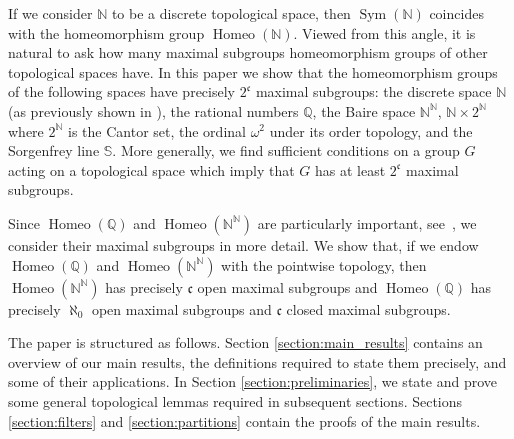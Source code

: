 \documentclass[11pt]{amsart}
\theoremstyle{definition}
\newcommand{\Homeo}{\operatorname{Homeo}}
\newcommand{\N}{\mathbb N}
\newcommand{\Q}{\mathbb Q}
\newcommand{\Sym}{\operatorname{Sym}}
\begin{document}
If we consider $\N$ to be a discrete topological space, then $\Sym(\N)$ coincides with the homeomorphism group $\Homeo(\N)$. Viewed from this angle, it is natural to ask how many maximal subgroups homeomorphism groups of other topological spaces have. 
In this paper we show that the homeomorphism groups of the following spaces have precisely $2^{\mathfrak{c}}$ maximal subgroups: the discrete space $\N$ (as previously shown in \cite{subgroups_macpherson_neumann}), the rational numbers $\Q$, the Baire space $\N^{\N}$, $\N\times 2^{\N}$ where $2^{\N}$ is the Cantor set, the ordinal $\omega^2$ under its order topology, and the Sorgenfrey line $\mathbb{S}$. More generally, we find sufficient conditions on a group $G$ acting on a topological space which imply that $G$ has at least $2^{\mathfrak c}$ maximal subgroups.

Since $\Homeo(\Q)$ and $\Homeo(\N^\N)$ are particularly important, see~\cite{Bruyns, Droste, Mekler, Neumann, Truss}, we consider their maximal subgroups in more detail.  %
We show that, if we endow $\Homeo(\Q)$ and $\Homeo(\N^\N)$ with the pointwise topology, then $\Homeo(\N^\N)$ has precisely $\mathfrak{c}$ open maximal subgroups and $\Homeo(\Q)$ has precisely $\aleph_0$ open maximal subgroups and $\mathfrak c$ closed maximal subgroups.

The paper is structured as follows. Section \ref{section:main_results} contains an overview of our main results, the definitions required to state them precisely, and some of their applications. In Section \ref{section:preliminaries}, we state and prove some general topological lemmas required in subsequent sections. Sections  \ref{section:filters} and \ref{section:partitions} contain the proofs of the main results. 
\end{document}
